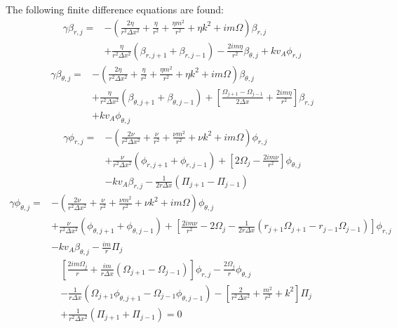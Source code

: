 \documentclass[letterpaper]{article}
\begin{document}
The following finite difference equations are found:
\begin{align}
\gamma\beta_{r, j} = &-(\frac{2\eta}{r^2 \Delta x^2} + \frac{\eta}{r^2} + \frac{\eta m^2}{r^2} + \eta k^2 + im\Omega )\beta_{r, j}
\\ \nonumber
&+\frac{\eta}{r^2 \Delta x^2}(\beta_{r, j+1} + \beta_{r, j-1}) - \frac{2im \eta}{r^2}\beta_{\theta,j} + k v_A \phi_{r,j}
\end{align}
\begin{align}
\gamma\beta_{\theta,j}=&-(\frac{2\eta}{r^2 \Delta x^2} + \frac{\eta}{r^2} + \frac{\eta m^2}{r^2} + \eta k^2 + im\Omega)\beta_{\theta, j}
\\ \nonumber
&+\frac{\eta}{r^2 \Delta x^2}(\beta_{\theta, j+1} + \beta_{\theta, j-1}) +\left[\frac{\Omega_{j+1}-\Omega_{j-1}}{2\Delta x} + \frac{2im\eta}{r^2}\right]\beta_{r,j}
\\ \nonumber
&+kv_A\phi_{\theta,j}
\end{align}
\begin{align}
\gamma\phi_{r, j} = &-(\frac{2\nu}{r^2 \Delta x^2} + \frac{\nu}{r^2} + \frac{\nu m^2}{r^2} + \nu k^2 + im\Omega)\phi_{r, j}
\\ \nonumber
&+\frac{\nu}{r^2 \Delta x^2}(\phi_{r, j+1} + \phi_{r, j-1}) + \left[2\Omega_{j}-\frac{2im\nu}{r^2} \right]\phi_{\theta, j} 
\\ \nonumber
& - kv_A\beta_{r,j} - \frac{1}{2 r \Delta x}\left(\Pi_{j+1}-\Pi_{j-1}\right)
\end{align}
\begin{align}
\gamma\phi_{\theta, j} = &-(\frac{2\nu}{r^2 \Delta x^2} + \frac{\nu}{r^2} + \frac{\nu m^2}{r^2} + \nu k^2 + im\Omega)\phi_{\theta, j}
\\ \nonumber
&+\frac{\nu}{r^2 \Delta x^2}(\phi_{\theta, j+1} + \phi_{\theta, j-1}) + \left[\frac{2im\nu}{r^2} - 2\Omega_j - \frac{1}{2r\Delta x}\left(r_{j+1}\Omega_{j+1}-r_{j-1}\Omega_{j-1}\right)\right]\phi_{r,j}
\\ \nonumber
& - kv_A \beta_{\theta, j} - \frac{im}{r}\Pi_{j}
\end{align}
\begin{align}
&\left[\frac{2im\Omega_j}{r} + \frac{im}{r\Delta x}(\Omega_{j+1}-\Omega_{j-1})\right]\phi_{r,j} - \frac{2\Omega_j}{r}\phi_{\theta,j} 
\\ \nonumber
&- \frac{1}{r\Delta x}\left(\Omega_{j+1}\phi_{\theta,j+1}-\Omega_{j-1}\phi_{\theta,j-1}\right) - \left[\frac{2}{r^2\Delta x^2} + \frac{m^2}{r^2}+k^2\right]\Pi_{j}
\\ \nonumber
&+\frac{1}{r^2\Delta x^2}\left(\Pi_{j+1} + \Pi_{j-1}\right) = 0
\end{align}
\end{document}
